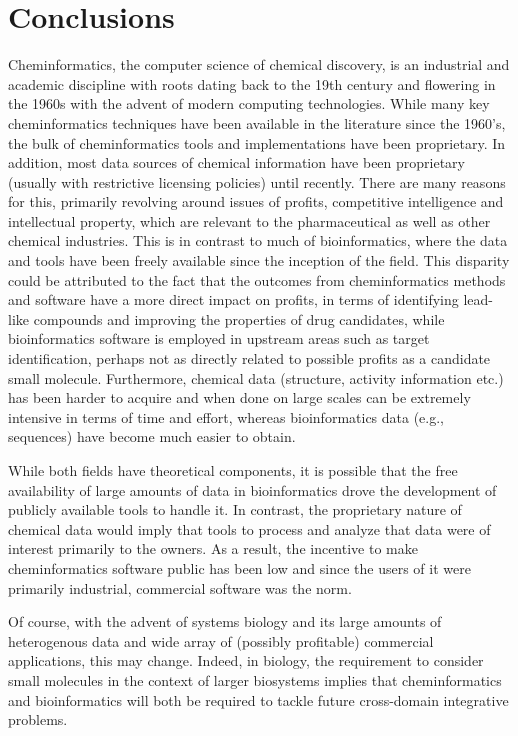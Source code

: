 \documentclass{sig-alternate}
\begin{document}
%
\section{Conclusions}
\label{sec:conclusions}
Cheminformatics, the computer science of chemical discovery, is an
industrial and academic discipline with roots dating back to the 19th
century and flowering in the 1960s with the advent of modern computing
technologies. While many key cheminformatics techniques have been
available in the literature since the 1960's, the bulk of
cheminformatics tools and implementations have been proprietary. In
addition, most data sources of chemical information have been
proprietary (usually with restrictive licensing policies) until
recently. There are many reasons for this, primarily revolving around
issues of profits, competitive intelligence and intellectual property,
which are relevant to the pharmaceutical as well as other chemical
industries. This is in contrast to much of bioinformatics, where the
data and tools have been freely available since the inception of the
field. This disparity could be attributed to the fact that the
outcomes from cheminformatics methods and software have a more direct
impact on profits, in terms of identifying lead-like compounds and
improving the properties of drug candidates, while bioinformatics
software is employed in upstream areas such as target identification,
perhaps not as directly related to possible profits as a candidate small
molecule. Furthermore, chemical data (structure, activity information
etc.) has been harder to acquire and when done on large scales can be
extremely intensive in terms of time and effort, whereas
bioinformatics data (e.g., sequences) have become much easier to obtain.

While both fields have theoretical components, it is possible that the
free availability of large amounts of data in bioinformatics drove the
development of publicly available tools to handle it. In contrast, the
proprietary nature of chemical data would imply that tools to process
and analyze that data were of interest primarily to the owners. As a
result, the incentive to make cheminformatics software public has been
low and since the users of it were primarily industrial, commercial
software was the norm.

Of course, with the advent of systems biology and its large amounts of
heterogenous data and wide array of (possibly profitable) commercial
applications, this may change. Indeed, in biology, the
requirement to consider small molecules in the context of larger
biosystems implies that cheminformatics and bioinformatics will both
be required to tackle future cross-domain integrative problems.
\end{document}
